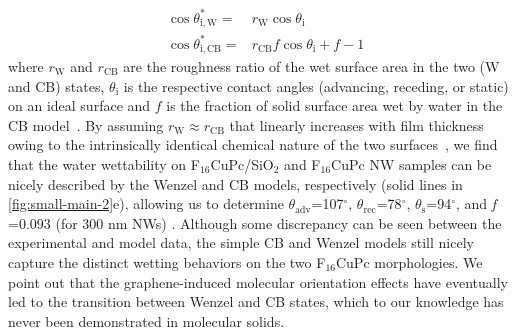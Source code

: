 \begin{eqnarray}
\label{eq:small-2}
&\cos \theta^{*}_{\mathrm{i,W}} =& r_{\mathrm{W}} \cos \theta_{\mathrm{i}} \\
&\cos \theta^{*}_{\mathrm{i,CB}} =& r_{\mathrm{CB}} f \cos \theta_{\mathrm{i}} + f - 1
\end{eqnarray}
where \(r_{\mathrm{W}}\) and \(r_{\mathrm{CB}}\) are the roughness
ratio of the wet surface area in the two (W and CB) states,
\(\theta_{\mathrm{i}}\) is the respective contact angles (advancing,
receding, or static) on an ideal surface and \(f\) is the fraction of
solid surface area wet by water in the CB
model~\cite{Yeh_2008_CBW_hys,McHale_2004,Joanny_1984,Patankar_2010_CBW_hys}.
%
By assuming \(r_{\mathrm{W}} \approx r_{\mathrm{CB}}\) that linearly
increases with film thickness owing to the intrinsically identical
chemical nature of the two surfaces~\citeyear{Yeh_2008_CBW_hys}, we
find that the water wettability on
F\(_{\text{16}}\)CuPc/SiO\(_{\text{2}}\) and F\(_{\text{16}}\)CuPc NW
samples can be nicely described by the Wenzel and CB models,
respectively (solid lines in \autoref{fig:small-main-2}e), allowing us
to determine \(\theta_{\mathrm{adv}}\)=107\(^{\circ}\),
\(\theta_{\mathrm{rec}}\)=78\(^{\circ}\),
\(\theta_{\mathrm{s}}\)=94\(^{\circ}\), and \emph{f} =0.093 (for 300
nm NWs) .
%
Although some discrepancy
can be seen between the experimental and model data, the simple CB
and Wenzel models still nicely capture the distinct wetting behaviors
on the two F\(_{\text{16}}\)CuPc morphologies. We point out that the
graphene-induced molecular orientation effects have eventually led to
the transition between Wenzel and CB states, which to our knowledge
has never been demonstrated in molecular solids.


